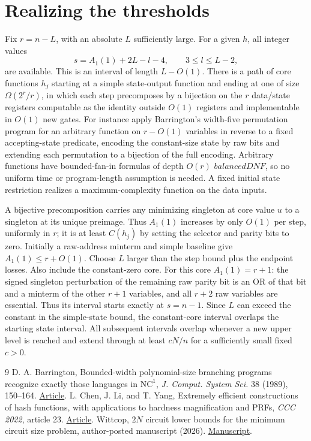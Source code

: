 \documentclass[11pt]{article}
\begin{document}
\section{Realizing the thresholds}

Fix \(r=n-L\), with an absolute \(L\) sufficiently large. For a given \(h\), all integer values
\[
 s=A_1(1)+2L-l-4,\qquad 3\le l\le L-2,
\]
are available. This is an interval of length \(L-O(1)\). There is a path of core functions \(h_j\) starting at a simple state-output function and ending at one of size \(\Omega(2^r/r)\), in which each step precomposes by a bijection on the \(r\) data/state registers computable as the identity outside \(O(1)\) registers and implementable in \(O(1)\) new gates. For instance apply Barrington's width-five permutation program \cite{barrington} for an arbitrary function on \(r-O(1)\) variables in reverse to a fixed accepting-state predicate, encoding the constant-size state by raw bits and extending each permutation to a bijection of the full encoding. Arbitrary functions have bounded-fan-in formulas of depth \(O(r)\) \(balanced DNF\), so no uniform time or program-length assumption is needed. A fixed initial state restriction realizes a maximum-complexity function on the data inputs.

A bijective precomposition carries any minimizing singleton at core value \(u\) to a singleton at its unique preimage. Thus \(A_1(1)\) increases by only \(O(1)\) per step, uniformly in \(r\); it is at least \(C(h_j)\) by setting the selector and parity bits to zero. Initially a raw-address minterm and simple baseline give \(A_1(1)\le r+O(1)\). Choose \(L\) larger than the step bound plus the endpoint losses. Also include the constant-zero core. For this core \(A_1(1)=r+1\): the signed singleton perturbation of the remaining raw parity bit is an OR of that bit and a minterm of the other \(r+1\) variables, and all \(r+2\) raw variables are essential. Thus its interval starts exactly at \(s=n-1\). Since \(L\) can exceed the constant in the simple-state bound, the constant-core interval overlaps the starting state interval. All subsequent intervals overlap whenever a new upper level is reached and extend through at least \(cN/n\) for a sufficiently small fixed \(c>0\).
\begin{thebibliography}{9}
 D. A. Barrington, Bounded-width polynomial-size branching programs recognize exactly those languages in \(\mathrm{NC}^1\), \emph{J. Comput. System Sci.} 38 (1989), 150--164. \href{https://doi.org/10.1016/0022-0000(89)90037-8}{Article}.
 L. Chen, J. Li, and T. Yang, Extremely efficient constructions of hash functions, with applications to hardness magnification and PRFs, \emph{CCC 2022}, article 23. \href{https://doi.org/10.4230/LIPIcs.CCC.2022.23}{Article}.
 Wittcop, \(2N\) circuit lower bounds for the minimum circuit size problem, author-posted manuscript (2026). \href{https://www.academia.edu/180415409/2N_Circuit_Lower_Bounds_for_the_Minimum_Circuit_Size_Problem}{Manuscript}.
\end{thebibliography}
\end{document}

